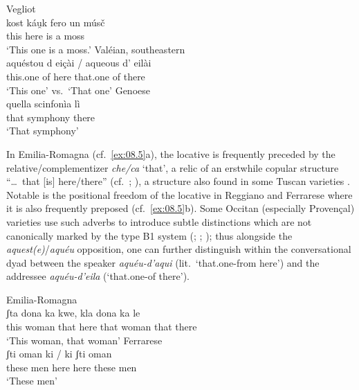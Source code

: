 \documentclass[output=paper]{langsci/langscibook}
\begin{document}
\ea\label{bkm:Ref370498282}\label{ex:08.4}
\ea     Vegliot \citep{Bartoli:1906a}\\
\gll   kost  káu̯k  fero  un  músč\\
this  here  is  a  moss\\
\glt \enquote*{This one is a moss.}
\ex Valéian, southeastern  \citep{Arnaud:1920a}\\
\gll     aquéstou  d  eiçài \textup{\quad /\quad}  aqueous  d’  eilài\\
this.one  of  here {} that.one  of  there\\
\glt \enquote*{This one} vs.\ \enquote*{That one}
\ex Genoese \citep{Forner:1997a}\\
\gll    quella scinfonìa lì\\
that symphony there\\
\glt    \enquote*{That symphony}\\
\z
\z

In Emilia-Romagna (cf.\ \ref{ex:08.5}a), the locative is frequently
preceded by the relative/complementizer \emph{che/ca} ‘that’, a relic of an
erstwhile copular structure \enquote{\dots{}~that [is] here/there}
(cf.\ \citealt[206]{Rohlfs:1968a}; \citealt[581]{Foresti:1988a}), a structure
also found in some Tuscan varieties \citep[203]{Rohlfs:1968a}. Notable is the
positional freedom of the locative in Reggiano and Ferrarese where it is also
frequently preposed (cf.\ \ref{ex:08.5}b). Some Occitan (especially
Provençal) varieties use such adverbs to introduce subtle distinctions which
are not canonically marked by the type B1 system
(\citealt[88f]{Koschwitz:1894a}; \citealt[33]{Ronjat:1913a};
\citealt[65]{Salvat:1998a}); thus alongside the \emph{aquest(e)}\slash\emph{aquéu}
opposition, one can further distinguish within the conversational dyad between
the speaker \emph{aquéu-d’aqui} (lit.\ ‘that.one-from here’) and the addressee
\emph{aquéu-d’eila} (‘that.one-of there’).\pagebreak

\ea\label{bkm:Ref370498313}\label{ex:08.5}
\ea Emilia-Romagna \citep{Foresti:1988a}\\
\gll   ʃta  dona  ka  kwe,  kla  dona  ka  le\\
this  woman  that  here  that  woman  that  there\\
\glt \enquote*{This woman, that woman}
\ex Ferrarese \citep{Foresti:1988a}\\
\gll     ʃti  oman  ki   /  ki  ʃti  oman\\
these  men  here {} here  these  men\\
\glt \enquote*{These men}\z
\z
\end{document}
